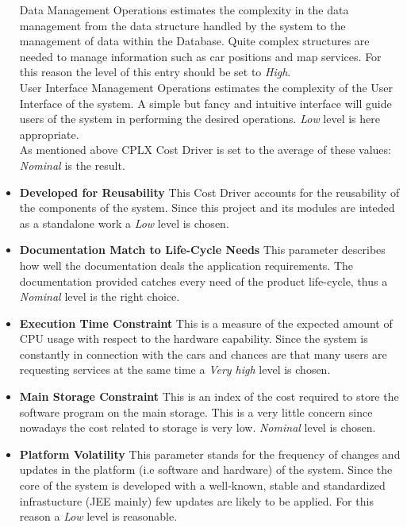 \documentclass[11pt,a4paper]{report}
\begin{document}
\begin{itemize}
Data Management Operations estimates the complexity in the data management from the data structure handled by the system to the management of data within the Database. Quite complex structures are needed to manage information such as car positions and map services. For this reason the level of this entry should be set to \textit{High}.\\
User Interface Management Operations estimates the complexity of the User Interface of the system. A simple but fancy and intuitive interface will guide users of the system in performing the desired operations. \textit{Low} level is here appropriate.\\
As mentioned above CPLX Cost Driver is set to the average of these values: \textit{Nominal} is the result.
	\item \textbf{Developed for Reusability}
This Cost Driver accounts for the reusability of the components of the system. Since this project and its modules are inteded as a standalone work a \textit{Low} level is chosen.
	\item \textbf{Documentation Match to Life-Cycle Needs}
This parameter describes how well the documentation deals the application requirements. The documentation provided catches every need of the product life-cycle, thus a \textit{Nominal} level is the right choice.
	\item \textbf{Execution Time Constraint}
This is a measure of the expected amount of CPU usage with respect to the hardware capability. Since the system is constantly in connection with the cars and chances are that many users are requesting services at the same time a \textit{Very high} level is chosen.
	\item \textbf{Main Storage Constraint}
This is an index of the cost required to store the software program on the main storage. This is a very little concern since nowadays the cost related to storage is very low. \textit{Nominal} level is chosen. 
	\item \textbf{Platform Volatility}
This parameter stands for the frequency of changes and updates in the platform (i.e software and hardware) of the system. Since the core of the system is developed with a well-known, stable and standardized infrastucture (JEE mainly) few updates are likely to be applied. For this reason a \textit{Low} level is reasonable.

\end{itemize}
\end{document}
